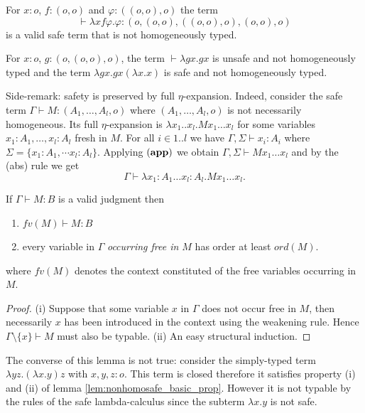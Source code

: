 \begin{exmp}
For $x:o$, $f:(o,o)$ and $\varphi:((o,o),o)$ the term $$\vdash \lambda x f \varphi .
\varphi : (o , (o, o) , ((o,o),o) , (o,o),o)$$ is
a valid safe term that is not homogeneously typed.
\end{exmp}

\begin{exmp}
For $x:o$, $g:(o,(o,o),o)$, the term $\vdash \lambda g x . g x$ is unsafe and not homogeneously typed
and the term $\lambda g x . g x (\lambda x . x)$ is safe and not homogeneously typed.
\end{exmp}

Side-remark: safety is preserved by full $\eta$-expansion. Indeed,
consider the safe term $\Gamma \vdash M:(A_1,\ldots,A_l,o)$ where
$(A_1,\ldots,A_l,o)$ is not necessarily homogeneous. Its full $\eta$-expansion
is $\lambda x_1 .. x_l . M x_1 \dots x_l$ for some variables
$x_1:A_1, \ldots, x_l:A_l$ fresh in $M$. For all $i \in 1..l$ we
have $\Gamma, \Sigma \vdash x_i :A_i$ where $\Sigma = \{ x_1:A_1,
\cdots x_l :A_l \}$. Applying $\mathbf{(app)}$ we obtain $\Gamma,
\Sigma \vdash M x_1 \ldots x_l$ and by the (abs) rule we get
$$\Gamma \vdash \lambda x_1:A_1 \ldots x_l:A_l .M x_1 \ldots x_l.$$

\begin{lem}
\label{lem:nonhomosafe_basic_prop}
If $\Gamma \vdash M : B$ is a valid judgment then
\begin{enumerate}
\item $fv(M) \vdash M : B$
\item every variable in $\Gamma$ \emph{occurring free in $M$} has order at
least $ord(M)$.
\end{enumerate}
where $fv(M)$ denotes the context constituted of the free variables occurring in $M$.
\end{lem}
\begin{proof}
(i) Suppose that some variable $x$ in $\Gamma$ does not occur free
in $M$, then necessarily $x$ has been introduced in the context
using the weakening rule. Hence $\Gamma\setminus \{ x \} \vdash M$
must also be typable. (ii) An easy structural induction.
\end{proof}

The converse of this lemma is not true: consider the simply-typed
term $\lambda y z. (\lambda x . y ) z$ with $x,y,z:o$. This term is
closed therefore it satisfies property (i) and (ii) of lemma
\ref{lem:nonhomosafe_basic_prop}. However it is not typable by the
rules of the safe lambda-calculus since the subterm $\lambda x .y$
is not safe.

